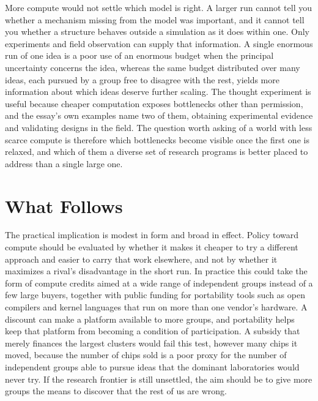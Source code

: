 \documentclass[12pt]{article}
\begin{document}
More compute would not settle which model is right. A larger run cannot tell you whether a mechanism missing from the model was important, and it cannot tell you whether a structure behaves outside a simulation as it does within one. Only experiments and field observation can supply that information. A single enormous run of one idea is a poor use of an enormous budget when the principal uncertainty concerns the idea, whereas the same budget distributed over many ideas, each pursued by a group free to disagree with the rest, yields more information about which ideas deserve further scaling. The thought experiment is useful because cheaper computation exposes bottlenecks other than permission, and the essay's own examples name two of them, obtaining experimental evidence and validating designs in the field. The question worth asking of a world with less scarce compute is therefore which bottlenecks become visible once the first one is relaxed, and which of them a diverse set of research programs is better placed to address than a single large one.

\section{What Follows}

The practical implication is modest in form and broad in effect. Policy toward compute should be evaluated by whether it makes it cheaper to try a different approach and easier to carry that work elsewhere, and not by whether it maximizes a rival's disadvantage in the short run. In practice this could take the form of compute credits aimed at a wide range of independent groups instead of a few large buyers, together with public funding for portability tools such as open compilers and kernel languages that run on more than one vendor's hardware. A discount can make a platform available to more groups, and portability helps keep that platform from becoming a condition of participation. A subsidy that merely finances the largest clusters would fail this test, however many chips it moved, because the number of chips sold is a poor proxy for the number of independent groups able to pursue ideas that the dominant laboratories would never try. If the research frontier is still unsettled, the aim should be to give more groups the means to discover that the rest of us are wrong.
\end{document}
